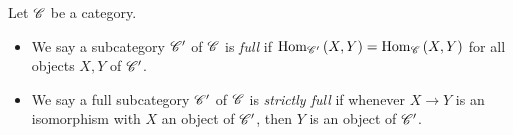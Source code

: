 \documentclass[dissertation.tex]{subfiles}
\begin{document}
\begin{defn}
  Let $\mathscr{C}$ be a category.
  \begin{itemize}
  \item
    We say a subcategory $\mathscr{C}^\prime$ of $\mathscr{C}$ is {\it full} if 
    $\operatorname{Hom}_{\mathscr{C}^\prime}\left(X,Y\right) = \operatorname{Hom}_{\mathscr{C}}\left(X,Y\right)$
    for all objects $X,Y$ of $\mathscr{C}^\prime$.
  \item
    We say a full subcategory $\mathscr{C}^\prime$ of $\mathscr{C}$ is {\it strictly full} if whenever $X \rightarrow Y$ is an isomorphism with $X$ an object of $\mathscr{C}^\prime$, then $Y$ is an object of $\mathscr{C}^\prime$.
  \end{itemize}
\end{defn}
\end{document}
